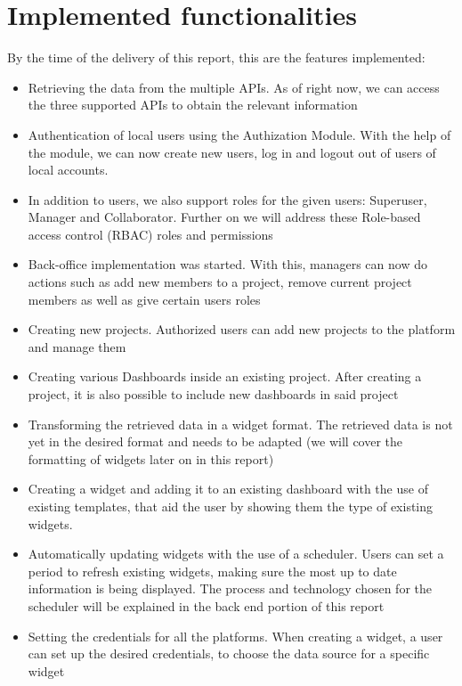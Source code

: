 \documentclass[a4paper,twoside,10pt]{report}
\begin{document}
\section{Implemented functionalities}
By the time of the delivery of this report, this are the features implemented:
\\ \newline
\begin{itemize}
     \item Retrieving the data from the multiple APIs. As of right now, we can access the three supported APIs to obtain the relevant information
    
     \item Authentication of local users using the Authization Module. With the help of the module, we can now create new users, log in and logout out of users of local accounts.
    
     \item In addition to users, we also support roles for the given users: Superuser, Manager and Collaborator. Further on we will address these Role-based access control\cite{RBAC} (RBAC) roles and permissions
    
     \item Back-office implementation was started. With this, managers can now do actions such as add new members to a project, remove current project members as well as give certain users roles

     \item Creating new projects. Authorized users can add new projects to the platform and manage them

     \item Creating various Dashboards inside an existing project. After creating a project, it is also possible to include new dashboards in said project

     \item Transforming the retrieved data in a widget format. The retrieved data is not yet in the desired format and needs to be adapted (we will cover the formatting of widgets later on in this report)

     \item Creating a widget and adding it to an existing dashboard with the use of existing templates, that aid the user by showing them the type of existing widgets.

     \item Automatically updating widgets with the use of a scheduler. Users can set a period to refresh existing widgets, making sure the most up to date information is being displayed. The process and technology chosen for the scheduler will be explained in the back end portion of this report

     \item Setting the credentials for all the platforms. When creating a widget, a user can set up the desired credentials, to choose the data source for a specific widget
\end{itemize}
\end{document}
